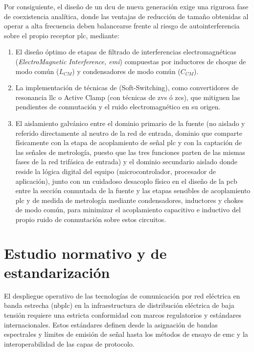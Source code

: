 Por consiguiente, el diseño de un \gls{dcu} de nueva generación exige una rigurosa fase de coexistencia analítica, donde las ventajas de reducción de tamaño obtenidas al operar a alta frecuencia deben balancearse frente al riesgo de autointerferencia sobre el propio receptor \gls{plc}, mediante:
\begin{enumerate}
    \item El diseño óptimo de etapas de filtrado de interferencias electromagnéticas (\textit{ElectroMagnetic Interference, \gls{emi}}) compuestas por inductores de choque de modo común ($L_{CM}$) y condensadores de modo común ($C_{CM}$).
     \item La implementación de técnicas de  (Soft-Switching), como convertidores de resonancia \gls{llc} o Active Clamp  (con técnicas de \gls{zvs} ó \gls{zcs}), que mitiguen las pendientes de conmutación y el ruido electromagnético en su origen.
    \item El aislamiento galvánico entre el dominio primario de la fuente (no aislado y referido directamente al neutro de la red de entrada, dominio que comparte físicamente con la etapa de acoplamiento de señal \gls{plc} y con la captación de las señales de metrología, puesto que las tres funciones parten de las mismas fases de la red trifásica de entrada) y el dominio secundario aislado donde reside la lógica digital del equipo (microcontrolador, procesador de aplicación), junto con un cuidadoso desacoplo físico en el diseño de la \gls{pcb} entre la sección conmutada de la fuente y las etapas sensibles de acoplamiento \gls{plc} y de medida de metrología mediante condensadores, inductores y chokes de modo común, para minimizar el acoplamiento capacitivo e inductivo del propio ruido de conmutación sobre estos circuitos.
\end{enumerate}

\section{Estudio normativo y de estandarización}
\label{sec:estudio_normativo}

El despliegue operativo de las tecnologías de comunicación por red eléctrica en banda estrecha (\gls{nbplc}) en la infraestructura de distribución eléctrica de baja tensión requiere una estricta conformidad con marcos regulatorios y estándares internacionales. Estos estándares definen desde la asignación de bandas espectrales y límites de emisión de señal hasta los métodos de ensayo de \gls{emc} y la interoperabilidad de las capas de protocolo.

